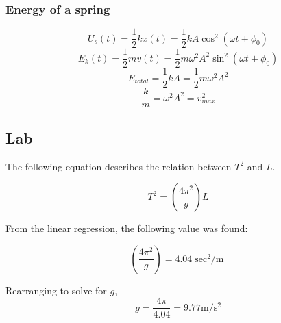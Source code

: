 \subsubsection{Energy of a spring}
$$U_s(t) = \frac{1}{2}kx(t) = \frac{1}{2}k A \cos^2(\omega t + \phi_0)$$
$$E_k(t) = \frac{1}{2}mv(t) = \frac{1}{2}m \omega^2 A^2 \sin^2(\omega t + \phi_0)$$
$$E_{total} = \frac{1}{2} kA = \frac{1}{2} m \omega^2 A^2$$
$$\frac{k}{m} = \omega^2 A^2 = v_{max}^2$$

\subsection{Lab}

The following equation describes the relation between $T^2$ and $L$.

$$T^2 = \left(\frac{4\pi^2}{g}\right)L$$

From the linear regression, the following value was found:

$$\left(\frac{4\pi^2}{g}\right) = 4.04 \si{\sec^2\per\m}$$

Rearranging to solve for $g$,
$$g = \frac{4\pi}{4.04} = 9.77 \si{\m\per\s^2}$$